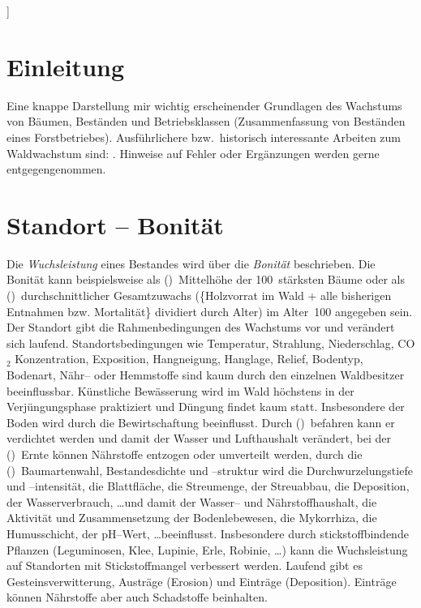 \documentclass[twocolumn]{scrartcl}
\begin{document}
]

\clearpage

\tableofcontents

\section{Einleitung}

Eine knappe Darstellung mir wichtig erscheinender Grundlagen des Wachstums von
Bäumen, Beständen und Betriebsklassen (Zusammenfassung von Beständen eines
Forstbetriebes). Ausführlichere bzw.\ historisch interessante Arbeiten zum
Waldwachstum sind:
\cite{guttenberg1885Wachstumsgesetze,guttenberg1912ZuwachslehreInHandbuchDerForstwissenschaft,vanselow1941Zuwachslehre,weck1948,wiedemann1951Ertragskunde,assmann1961Waldertraskunde,erteld1966Waldertragslehre,mitscherlich1975WaldWachstumUmwelt,kramer1988Waldwachstumslehre,wenk1990Waldertragslehre,Gadow1999Modelling,Gadov2003Waldstruktur,pretzsch2002Grundlagen,Pretzsch2003Modellierung,Vanclay2006,Weiskittel2011,Pretzsch2019}.
Hinweise auf Fehler oder Ergänzungen werden gerne entgegengenommen.

\section{Standort -- Bonität}

Die \emph{Wuchsleistung} eines Bestandes wird über die \emph{Bonität}
beschrieben. Die Bonität kann beispielsweise als (\textbullet)~Mittelhöhe der
100~stärksten Bäume oder als (\textbullet)~durchschnittlicher Gesamtzuwachs
(\{Holzvorrat im Wald + alle bisherigen Entnahmen bzw. Mortalität\} dividiert
durch Alter) im Alter~100 angegeben sein. Der Standort gibt die
Rahmenbedingungen des Wachstums vor und verändert sich laufend.
Standortsbedingungen wie Temperatur, Strahlung, Niederschlag, CO$_2$
Konzentration, Exposition, Hangneigung, Hanglage, Relief, Bodentyp, Bodenart,
Nähr-- oder Hemmstoffe sind kaum durch den einzelnen Waldbesitzer beeinflussbar.
Künstliche Bewässerung wird im Wald höchstens in der Verjüngungsphase
praktiziert und Düngung findet kaum statt. Insbesondere der Boden wird durch die
Bewirtschaftung beeinflusst. Durch (\textbullet)~befahren kann er verdichtet
werden und damit der Wasser und Lufthaushalt verändert, bei der
(\textbullet)~Ernte können Nährstoffe entzogen oder umverteilt werden, durch die
(\textbullet)~Baumartenwahl, Bestandesdichte und --struktur wird die
Durchwurzelungstiefe und --intensität, die Blattfläche, die Streumenge, der
Streuabbau, die Deposition, der Wasserverbrauch, \dots und damit der Wasser--
und Nährstoffhaushalt, die Aktivität und Zusammensetzung der Bodenlebewesen, die
Mykorrhiza, die Humusschicht, der pH--Wert, \dots beeinflusst. Insbesondere
durch stickstoffbindende Pflanzen (Leguminosen, Klee, Lupinie, Erle, Robinie,
\dots) kann die Wuchsleistung auf Standorten mit Stickstoffmangel verbessert
werden. Laufend gibt es Gesteinsverwitterung, Austräge (Erosion) und Einträge
(Deposition). Einträge können Nährstoffe aber auch Schadstoffe beinhalten.
\end{document}

